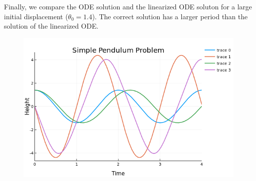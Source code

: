 Finally, we compare the ODE solution and the linearized ODE soluton for a large initial displacement ($\theta_0=1.4$). The correct solution has a larger period than the solution of the linearized ODE.


\begin{figure}[H]
  \includegraphics[scale=0.5]{images/pendulum_1_3.png}
\end{figure}



